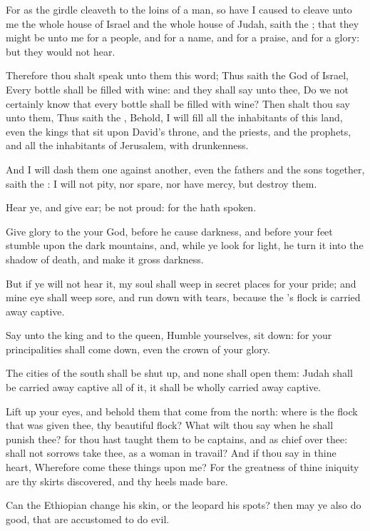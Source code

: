 \verse For as the girdle cleaveth to the loins of a man, so have I caused to cleave unto me the whole house of Israel and the whole house of Judah, saith the \LORD; that they might be unto me for a people, and for a name, and for a praise, and for a glory: but they would not hear.

\verse Therefore thou shalt speak unto them this word; Thus saith the \LORD God of Israel, Every bottle shall be filled with wine: and they shall say unto thee, Do we not certainly know that every bottle shall be filled with wine?  \verse Then shalt thou say unto them, Thus saith the \LORD, Behold, I will fill all the inhabitants of this land, even the kings that sit upon David's throne, and the priests, and the prophets, and all the inhabitants of Jerusalem, with drunkenness.

\verse And I will dash them one against another, even the fathers and the sons together, saith the \LORD: I will not pity, nor spare, nor have mercy, but destroy them.

\verse Hear ye, and give ear; be not proud: for the \LORD hath spoken.

\verse Give glory to the \LORD your God, before he cause darkness, and before your feet stumble upon the dark mountains, and, while ye look for light, he turn it into the shadow of death, and make it gross darkness.

\verse But if ye will not hear it, my soul shall weep in secret places for your pride; and mine eye shall weep sore, and run down with tears, because the \LORD's flock is carried away captive.

\verse Say unto the king and to the queen, Humble yourselves, sit down: for your principalities shall come down, even the crown of your glory.

\verse The cities of the south shall be shut up, and none shall open them: Judah shall be carried away captive all of it, it shall be wholly carried away captive.

\verse Lift up your eyes, and behold them that come from the north: where is the flock that was given thee, thy beautiful flock?  \verse What wilt thou say when he shall punish thee? for thou hast taught them to be captains, and as chief over thee: shall not sorrows take thee, as a woman in travail?  \verse And if thou say in thine heart, Wherefore come these things upon me?  For the greatness of thine iniquity are thy skirts discovered, and thy heels made bare.

\verse Can the Ethiopian change his skin, or the leopard his spots?  then may ye also do good, that are accustomed to do evil.

